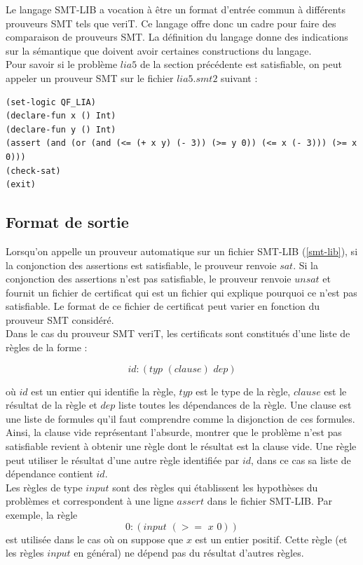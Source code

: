 \documentclass[11pt]{article}
\begin{document}
Le langage SMT-LIB a vocation à être un format d'entrée commun à différents prouveurs SMT tels que veriT. Ce langage offre donc un cadre pour faire des comparaison de prouveurs SMT. La définition du langage \cite{smtlib} donne des indications sur la sémantique que doivent avoir certaines constructions du langage.\\

Pour savoir si le problème $lia5$ de la section précédente est satisfiable, on peut appeler un prouveur SMT sur le fichier $lia5.smt2$ suivant :
\begin{lstlisting}[frame=single]
(set-logic QF_LIA)
(declare-fun x () Int)
(declare-fun y () Int)
(assert (and (or (and (<= (+ x y) (- 3)) (>= y 0)) (<= x (- 3))) (>= x 0)))
(check-sat)
(exit)
\end{lstlisting}

\subsection{Format de sortie} \label{sortie}

Lorsqu'on appelle un prouveur automatique sur un fichier SMT-LIB (\ref{smt-lib}), si la conjonction des assertions est satisfiable, le prouveur renvoie $sat$. Si la conjonction des assertions n'est pas satisfiable, le prouveur renvoie $unsat$ et fournit un fichier de certificat qui est un fichier qui explique pourquoi ce n'est pas satisfiable. Le format de ce fichier de certificat peut varier en fonction du prouveur SMT considéré. \\


Dans le cas du prouveur SMT veriT, les certificats sont constitués d'une liste de règles de la forme : 

\[id:(typ \,\, (clause) \,\, dep)\]

où $id$ est un entier qui identifie la règle, $typ$ est le type de la règle, $clause$ est le résultat de la règle et $dep$ liste toutes les dépendances de la règle. Une clause est une liste de formules qu'il faut comprendre comme la disjonction de ces formules. Ainsi, la clause vide représentant l'absurde, montrer que le problème n'est pas satisfiable revient à obtenir une règle dont le résultat est la clause vide. Une règle peut utiliser le résultat d'une autre règle identifiée par $id$, dans ce cas sa liste de dépendance contient $id$. \\

Les règles de type $input$ sont des règles qui établissent les hypothèses du problèmes et correspondent à une ligne $assert$ dans le fichier SMT-LIB. Par exemple, la règle 
\[ 0:(input \,\, (>= \,\,x \,\,0)) \]
est utilisée dans le cas où on suppose que $x$ est un entier positif. Cette règle (et les règles $input$ en général) ne dépend pas du résultat d'autres règles.\\
\end{document}
